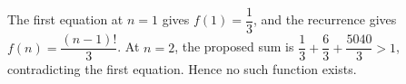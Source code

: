 The first equation at $n=1$ gives $f (1) = \dfrac{1}{3}$, and the recurrence gives $f (n) = \dfrac{(n-1) !}{3}$. At $n=2$, the proposed sum is $\dfrac{1}{3} + \dfrac{6}{3} + \dfrac{5040}{3} > 1$, contradicting the first equation. Hence no such function exists.
